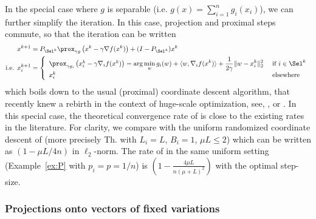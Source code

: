 In the special case where $g$ is separable (i.e. $g(x) = \sum_{i=1}^n g_i(x_i)$), we can further simplify the iteration. In this case, projection and proximal steps commute, so that the iteration can be written
\begin{align*}
 x^{k+1} &=  P_{\Sel^k}\prox_{\gamma g} \left( x^k - \gamma\nabla f(x^k)\right)  + (I -  P_{\Sel^k}) x^k\\
\text{i.e. } x_i^{k+1} &= \left\{  \begin{array}{ll}
   \prox_{\gamma g_i} \left( x_i^k - \gamma\nabla_i f(x^k)\right) = \displaystyle\arg\min_w g_i(w) + \langle w , \nabla_i f(x^k) \rangle  + \frac{1}{2\gamma}\|w - x_i^k\|_2^2 & \text{ if } i \in \Sel^k  \\
   x_i^k  & \text{ elsewhere}
\end{array}  \right. 
\end{align*}
which boils down to the usual (proximal) coordinate descent algorithm, that recently knew a rebirth in the context of huge-scale optimization, see\;\cite{tseng2001convergence}, \cite{nesterov2012efficiency}, \cite{richtarik2014iteration} or \cite{wright2015coordinate}.
In this special case, the theoretical convergence rate of \algo is close to the existing rates in the literature. 
For clarity, %
we compare with the uniform randomized coordinate descent of \cite{richtarik2014iteration} 
(more precisely Th. with $L_i =L$, $B_i=1$, $\mu L\leq 2$) which can be written as $\left(1 - \mu L/4n\right)$ in $\ell_2$-norm.
The rate of \algo in the same uniform setting (Example~\ref{ex:P} with $p_i = p=1/n$) is $\left(1 - \frac{4\mu L}{n(\mu+ L)^2}\right)$ with the optimal step-size.

\subsubsection{Projections onto vectors of fixed variations}
\label{sec:var}

